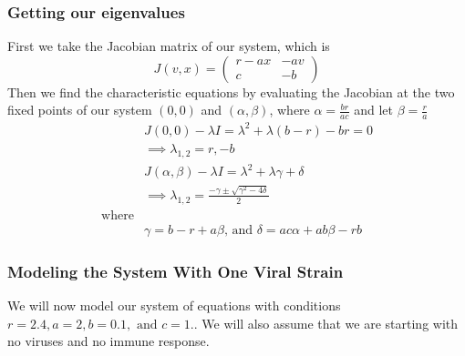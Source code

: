 \documentclass{article}
\begin{document}
\subsubsection{Getting our eigenvalues}
First we take the Jacobian matrix of our system, which is
\begin{equation}
    J(v,x) =
    \begin{pmatrix}
        r-ax    & -av \\
        c       & -b
    \end{pmatrix}
\end{equation}
Then we find the characteristic equations by evaluating the Jacobian at the two fixed points of our system $(0,0)$ and $(\alpha,\beta)$, where $\alpha = \frac{br}{ac} $ and let $\beta = \frac{r}{a} $
\begin{equation}
    \begin{split}
        &J(0,0) - \lambda I = \lambda^2 + \lambda(b-r) -br = 0\\
        &\implies \lambda_{1,2} = r,-b\\
        &J(\alpha,\beta)  - \lambda I =  \lambda^2 + \lambda \gamma + \delta\\ 
        &\implies \lambda_{1,2} = \frac{-\gamma \pm \sqrt{\gamma^2 - 4\delta}}{2} \\
        \text{where} \\
        &\gamma =  b - r + a\beta \text{, and } \delta = ac\alpha + ab\beta -rb
    \end{split}
\end{equation}
\subsubsection{Modeling the System With One Viral Strain}
We will now model our system of equations with conditions $r = 2.4, a = 2, b = 0.1, \text{ and }c = 1.$. We will also assume that we are starting with no viruses and no immune response.
\label{sub:modeling the sytem}
\end{document}
